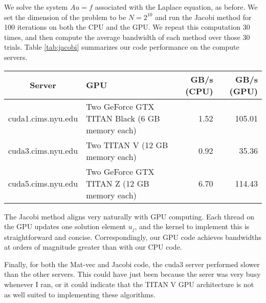 \begin{questions}

\begin{solution}
 	We solve the system $Au = f$ associated with the Laplace equation,
 	as before. We set the dimension of the problem to be $N = 2^{10}$
 	and run the Jacobi method for 100 iterations on both the CPU and
 	the GPU. We repeat this computation 30 times, and then compute the
 	average bandwidth of each method over those 30 trials. Table
 	\ref{tab:jacobi} summarizes our code performance on the compute
 	servers.
 	
 	\begin{center}
    \begin{tabular}{|c|p{5cm}|r|r|}
    \hline
    Server & GPU & GB/s (CPU) & GB/s (GPU) \\
    \hline\hline
    cuda1.cims.nyu.edu & Two GeForce GTX TITAN Black (6 GB memory each) 
        & 1.52 & 105.01 \\ 
    \hline
    cuda3.cims.nyu.edu & Two TITAN V (12 GB memory each) 
        & 0.92 & 35.36 \\ 
    \hline
    cuda5.cims.nyu.edu & Two GeForce GTX TITAN Z (12 GB memory each) 
        & 6.70 & 114.43 \\ 
    \hline
    \end{tabular}
    \label{tab:jacobi}
    \end{center}
    
    The Jacobi method aligns very naturally with GPU computing. Each 
    thread on the GPU updates one solution element $u_j$, and the 
    kernel to implement this is straightforward and concise.
    Correspondingly, our GPU code achieves bandwidths at orders of
    magnitude greater than with our CPU code.
    
    Finally, for both the Mat-vec and Jacobi code, the cuda3 server performed
    slower than the other servers.
    This could have just been because the serer was very busy whenever I 
    ran, or it could indicate that the TITAN V GPU architecture is not 
    as well suited to implementing these algorithms.
\end{solution}








\end{questions}
